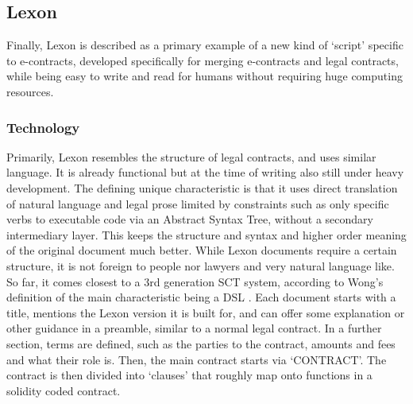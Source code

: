 \documentclass[conference]{IEEEtran}
\begin{document}


\subsection{Lexon}

Finally, Lexon is described as a primary example of a new kind of ‘script’ specific to e-contracts, developed specifically for merging e-contracts and legal contracts, while being easy to write and read for humans without requiring huge computing resources.
\subsubsection{Technology} %
Primarily, Lexon \cite{diedrichLexonBibleHitchhiker2020,lexonfoundationLexonFoundationLexonrust} resembles the structure of legal contracts, and uses similar language. It is already functional but at the time of writing also still under heavy development. The defining unique characteristic is that it uses direct translation of natural language and legal prose limited by constraints such as only specific verbs to executable code via an Abstract Syntax Tree, without a secondary intermediary layer. This keeps the structure and syntax and higher order meaning of the original document much better. While Lexon documents require a certain structure, it is not foreign to people nor lawyers and very natural language like.
So far, it comes closest to a
3rd generation SCT system, according to Wong’s definition of the main characteristic being a DSL \cite{wongmengComputableContractsAcademia2018}.
Each document starts with a title, mentions the Lexon version it is built for, and can offer some explanation or other guidance in a preamble, similar to a normal legal contract. In a further section, terms are defined, such as the parties to the contract, amounts and fees and what their role is.
Then, the main contract starts via ‘CONTRACT’. The contract is then divided into ‘clauses’ that roughly map onto functions in a solidity coded contract.
\end{document}
